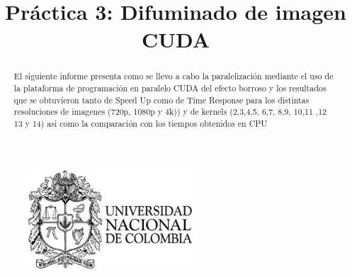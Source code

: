 \documentclass{IEEEtran}
\begin{document}
%
\title{Práctica 3: Difuminado de imagen CUDA}


\author{
}


\maketitle

\begin{figure}[!t]
\centering
\includegraphics[width=2.5in]{logo_unal}
\label{fig_sim}
\end{figure}
\begin{abstract}
El siguiente informe presenta como se llevo a cabo la paralelización mediante el uso de la plataforma de programación en paralelo CUDA   del efecto borroso y los resultados que se obtuvieron tanto de Speed Up como de Time Response para los distintas resoluciones  de imagenes (720p, 1080p y 4k)) y de kernels (2,3,4,5, 6,7, 8,9, 10,11 ,12 13 y 14) asi como la comparación con los tiempos obtenidos en CPU
\end{abstract}



\IEEEpeerreviewmaketitle
\end{document}
